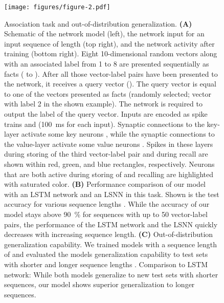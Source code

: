\documentclass{article}
\begin{document}
\begin{figure}\centering
\texttt{[image: figures/figure-2.pdf]}
\caption{Association task and out-of-distribution generalization.
\textbf{(A)} Schematic of the network model (left), the network input for an input sequence of length  (top right), and the network activity after training (bottom right).
Eight \num{10}-dimensional random vectors along with an associated label from \num{1} to \num{8} are presented sequentially as facts ( to ). After all those vector-label pairs have been presented to the network, it receives a query vector (). The query vector is equal to one of the vectors presented as facts (randomly selected; vector with label \num{2} in the shown example). The network is required to output the label of the query vector. Inputs are encoded as spike trains  and  (\SI{100}{ms} for each input). Synaptic connections to the key-layer activate some key neurons , while the synaptic connections to the value-layer activate some value neurons . Spikes in these layers during storing of the third vector-label pair  and during recall are shown within red, green, and blue rectangles, respectively. Neurons that are both active during storing of  and recalling are highlighted with saturated color.
\textbf{(B)} Performance comparison of our model with an LSTM network and an LSNN in this task. Shown is the test accuracy for various sequence lengths . While the accuracy of our model stays above \SI{90}{\percent} for sequences with up to \num{50} vector-label pairs, the performance of the LSTM network and the LSNN quickly decreases with increasing sequence length.
\textbf{(C)} Out-of-distribution generalization capability. We trained models with a sequence length of  and evaluated the models generalization capability to test sets with shorter and longer sequence lengths . Comparison to LSTM network: While both models generalize to new test sets with shorter sequences, our model shows superior generalization to longer sequences.
}
\label{fig:fig2}
\end{figure}
\end{document}
